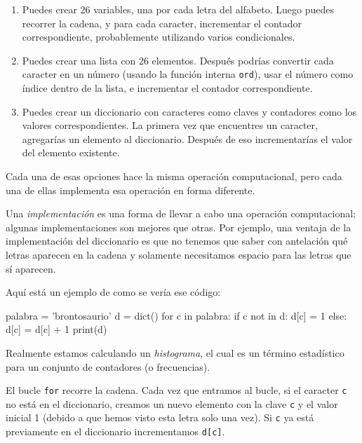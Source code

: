 \begin{enumerate}
\def\labelenumi{\arabic{enumi}.}
\item
  Puedes crear 26 variables, una por cada letra del alfabeto. Luego
  puedes recorrer la cadena, y para cada caracter, incrementar el
  contador correspondiente, probablemente utilizando varios
  condicionales.
\item
  Puedes crear una lista con 26 elementos. Después podrías convertir
  cada caracter en un número (usando la función interna \texttt{ord}),
  usar el número como índice dentro de la lista, e incrementar el
  contador correspondiente.
\item
  Puedes crear un diccionario con caracteres como claves y contadores
  como los valores correspondientes. La primera vez que encuentres un
  caracter, agregarías un elemento al diccionario. Después de eso
  incrementarías el valor del elemento existente.
\end{enumerate}

Cada una de esas opciones hace la misma operación computacional, pero
cada una de ellas implementa esa operación en forma diferente.


Una \emph{implementación} es una forma de llevar a cabo una operación
computacional; algunas implementaciones son mejores que otras. Por
ejemplo, una ventaja de la implementación del diccionario es que no
tenemos que saber con antelación qué letras aparecen en la cadena y
solamente necesitamos espacio para las letras que sí aparecen.

Aquí está un ejemplo de como se vería ese código:


\begin{python}[frame=single]
palabra = 'brontosaurio'
d = dict()
for c in palabra:
    if c not in d:
        d[c] = 1
    else:
        d[c] = d[c] + 1
print(d)
\end{python}


Realmente estamos calculando un \emph{histograma}, el cual es un término
estadístico para un conjunto de contadores (o frecuencias).

  

El bucle \texttt{for} recorre la cadena. Cada vez que entramos al bucle,
si el caracter \texttt{c} no está en el diccionario, creamos un nuevo
elemento con la clave \texttt{c} y el valor inicial 1 (debido a que
hemos visto esta letra solo una vez). Si \texttt{c} ya está previamente
en el diccionario incrementamos \texttt{d{[}c{]}}.

